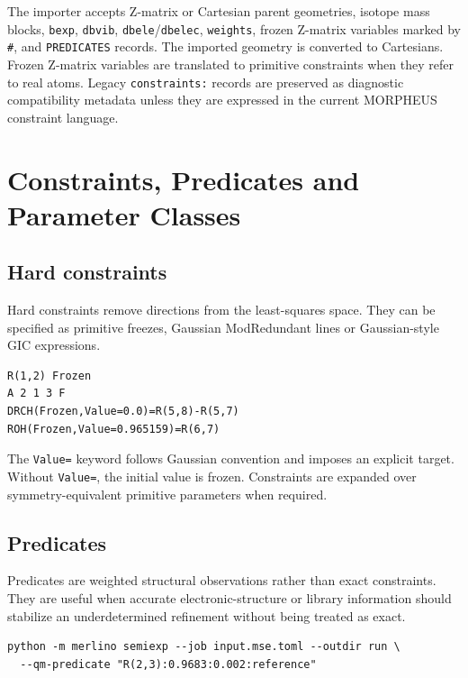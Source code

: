 \documentclass[11pt]{article}
\begin{document}
The importer accepts Z-matrix or Cartesian parent geometries, isotope mass
blocks, \texttt{bexp}, \texttt{dbvib}, \texttt{dbele}/\texttt{dbelec},
\texttt{weights}, frozen Z-matrix variables marked by \texttt{\#}, and
\texttt{PREDICATES} records.  The imported geometry is converted to Cartesians.
Frozen Z-matrix variables are translated to primitive constraints when they
refer to real atoms.  Legacy \texttt{constraints:} records are preserved as
diagnostic compatibility metadata unless they are expressed in the current MORPHEUS
constraint language.

\section{Constraints, Predicates and Parameter Classes}

\subsection{Hard constraints}

Hard constraints remove directions from the least-squares space.  They can be
specified as primitive freezes, Gaussian ModRedundant lines or Gaussian-style
GIC expressions.

\begin{lstlisting}[style=merlino]
R(1,2) Frozen
A 2 1 3 F
DRCH(Frozen,Value=0.0)=R(5,8)-R(5,7)
ROH(Frozen,Value=0.965159)=R(6,7)
\end{lstlisting}

\noindent
The \texttt{Value=} keyword follows Gaussian convention and imposes an explicit
target.  Without \texttt{Value=}, the initial value is frozen.  Constraints are
expanded over symmetry-equivalent primitive parameters when required.

\subsection{Predicates}

Predicates are weighted structural observations rather than exact constraints.
They are useful when accurate electronic-structure or library information
should stabilize an underdetermined refinement without being treated as exact.

\begin{lstlisting}[style=merlino]
python -m merlino semiexp --job input.mse.toml --outdir run \
  --qm-predicate "R(2,3):0.9683:0.002:reference"
\end{lstlisting}
\end{document}
